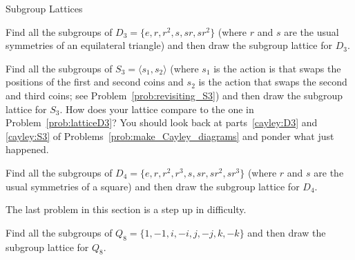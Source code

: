 \begin{section}{Subgroup Lattices}
\begin{problem}\label{prob:latticeD3}
Find all the subgroups of $D_3=\{e,r,r^2,s,sr,sr^2\}$ (where $r$ and $s$ are the usual symmetries of an equilateral triangle) and then draw the subgroup lattice for $D_3$.
\end{problem}

\begin{problem}
Find all the subgroups of $S_3=\langle s_1, s_2\rangle$ (where $s_1$ is the action is that swaps the positions of the first and second coins and $s_2$ is the action that swaps the second and third coins; see Problem~\ref{prob:revisiting_S3}) and then draw the subgroup lattice for $S_3$. How does your lattice compare to the one in Problem~\ref{prob:latticeD3}? You should look back at parts~\ref{cayley:D3} and \ref{cayley:S3} of Problems~\ref{prob:make_Cayley_diagrams} and ponder what just happened.
\end{problem}

\begin{problem}
Find all the subgroups of $D_4=\{e,r,r^2,r^3,s,sr,sr^2,sr^3\}$ (where $r$ and $s$ are the usual symmetries of a square) and then draw the subgroup lattice for $D_4$.
\end{problem}

The last problem in this section is a step up in difficulty.

\begin{problem}
Find all the subgroups of $Q_8=\{1,-1,i,-i,j,-j,k,-k\}$ and then draw the subgroup lattice for $Q_8$.
\end{problem}

\end{section}



